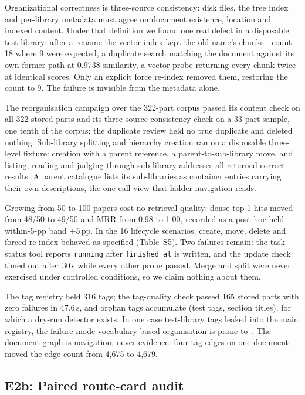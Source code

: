 Organizational correctness is three-source consistency: disk files, the tree
index and per-library metadata must agree on document existence, location and
indexed content. Under that definition we found one real defect in a
disposable test library: after a rename the vector index kept the old name's
chunks---count 18 where 9 were expected, a duplicate search matching the
document against its own former path at 0.9738 similarity, a vector probe
returning every chunk twice at identical scores. Only an explicit force
re-index removed them, restoring the count to 9. The failure is invisible from
the metadata alone.

The reorganisation campaign over the 322-part corpus passed its content
check on all 322 stored parts and its three-source consistency check on a
33-part sample, one tenth of the corpus; the duplicate review held no true
duplicate and deleted nothing. Sub-library splitting and hierarchy
creation ran on a disposable three-level fixture: creation with a parent
reference, a parent-to-sub-library move, and listing, reading and judging
through sub-library addresses all returned correct results. A parent catalogue
lists its sub-libraries as container entries carrying their own descriptions,
the one-call view that ladder navigation reads.

Growing from 50 to 100 papers cost no retrieval quality: dense top-1 hits moved
from 48/50 to 49/50 and MRR from 0.98 to 1.00, recorded as a post hoc
held-within-5-pp band
$\pm$5\,pp. In the 16 lifecycle scenarios, create, move, delete and forced
re-index behaved as specified (Table~S5). Two failures remain: the task-status
tool reports \texttt{running} after \texttt{finished\_at} is written, and the
update check timed out after 30\,s while every other probe passed. Merge and
split were never exercised under controlled conditions, so we claim nothing
about them.

The tag registry held 316 tags; the tag-quality check passed 165
stored parts with zero failures in 47.6\,s, and orphan tags accumulate (test tags,
section titles), for which a dry-run detector exists. In one case test-library
tags leaked into the main registry, the failure mode vocabulary-based
organisation is prone to~\cite{golder-tagging-2006}. The document graph is
navigation, never evidence: four tag edges on one document moved the edge count
from 4{,}675 to 4{,}679.

\subsection{E2b: Paired route-card audit}
\label{sec:routing-audit}

